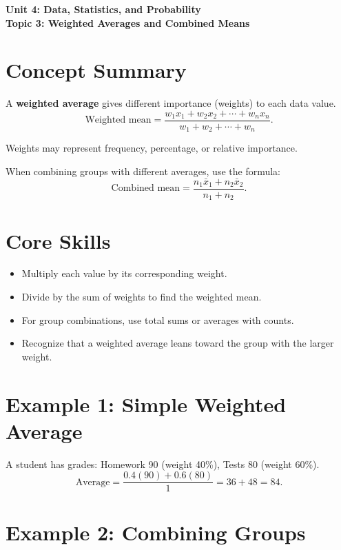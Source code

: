\documentclass[14pt]{extarticle}
\begin{document}
\raggedright
{}

\begin{center}
    \LARGE \textbf{Unit 4: Data, Statistics, and Probability} \\[6pt]
    \Large \textbf{Topic 3: Weighted Averages and Combined Means}
\end{center}

\vspace{1em}

\section*{Concept Summary}

A \textbf{weighted average} gives different importance (weights) to each data value.  
\[
\text{Weighted mean} = \frac{w_1x_1 + w_2x_2 + \cdots + w_nx_n}{w_1 + w_2 + \cdots + w_n}.
\]

Weights may represent frequency, percentage, or relative importance.

When combining groups with different averages, use the formula:
\[
\text{Combined mean} = \frac{n_1\bar{x}_1 + n_2\bar{x}_2}{n_1 + n_2}.
\]

\section*{Core Skills}
\begin{itemize}
  \item Multiply each value by its corresponding weight.
  \item Divide by the sum of weights to find the weighted mean.
  \item For group combinations, use total sums or averages with counts.
  \item Recognize that a weighted average leans toward the group with the larger weight.
\end{itemize}

\section*{Example 1: Simple Weighted Average}

A student has grades:  
Homework 90 (weight 40\%), Tests 80 (weight 60\%).  
\[
\text{Average} = \frac{0.4(90)+0.6(80)}{1} = 36 + 48 = \boxed{84}.
\]

\section*{Example 2: Combining Groups}
\end{document}
